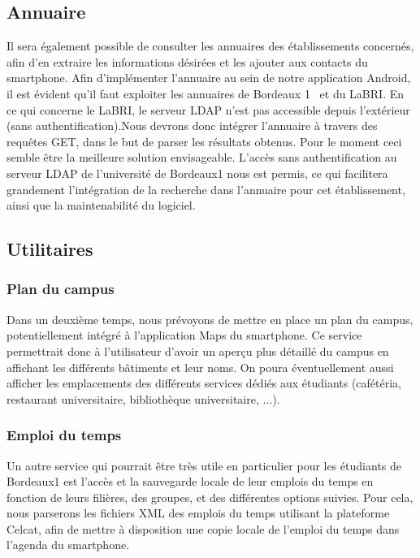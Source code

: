 \documentclass [pdftex,12pt] {report}
\begin{document}
\subsection{Annuaire}
Il sera également possible de consulter les annuaires des établissements concernés, afin d'en extraire les informations désirées et les ajouter aux contacts du smartphone.
Afin d'implémenter l'annuaire au sein de notre application Android, il est évident qu'il faut exploiter les annuaires de Bordeaux 1~\cite{AnnuaireBdx1} et du LaBRI. En ce qui concerne le LaBRI, le serveur LDAP n'est pas accessible depuis l'extérieur (sans authentification).Nous devrons donc intégrer l'annuaire à travers des requêtes GET, dans le but de parser les résultats obtenus. Pour le moment ceci semble être la meilleure solution envisageable. L'accès sans authentification au serveur LDAP de l'université de Bordeaux1 nous est permis, ce qui facilitera grandement l'intégration de la recherche dans l'annuaire pour cet établissement, ainsi que la maintenabilité du logiciel.


\subsection{Utilitaires}
\subsubsection{Plan du campus}
Dans un deuxième temps, nous prévoyons de mettre en place un plan du campus, potentiellement intégré à l'application Maps du smartphone.
Ce service permettrait donc à l'utilisateur d'avoir un aperçu plus détaillé du campus en affichant les différents bâtiments et leur noms.
On poura éventuellement aussi afficher les emplacements des différents services dédiés aux étudiants (cafétéria, restaurant universitaire, bibliothèque universitaire, ...).

\subsubsection{Emploi du temps}
Un autre service qui pourrait être très utile en particulier pour les étudiants de Bordeaux1 est l'accès et la sauvegarde locale de leur emplois du temps en fonction de leurs filières, des groupes, et des différentes options suivies. 
Pour cela, nous parserons les fichiers XML des emplois du temps utilisant la plateforme Celcat\cite{EdTxml}, afin de mettre à disposition une copie locale de l'emploi du temps dans l'agenda du smartphone.
\end{document}
